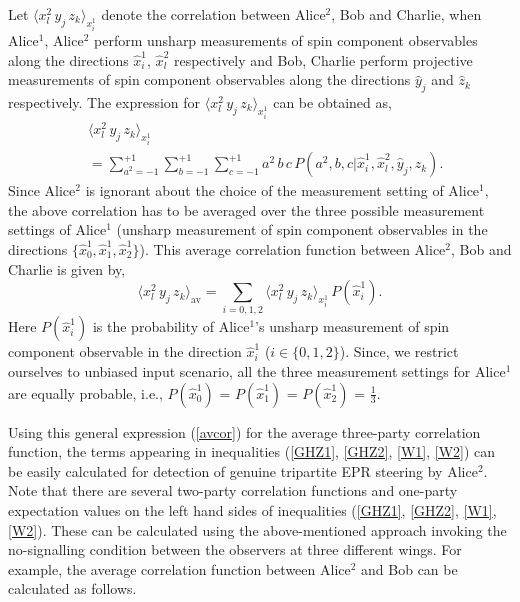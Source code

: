 \documentclass[pra,a4paper,aps,twocolumn,showpacs,superscriptaddress,groupedaddress]{revtex4}
\begin{document}

Let $\langle x^2_l \, y_j \, z_k \rangle_{x^1_i}$ denote the correlation between Alice$^2$, Bob and Charlie, when Alice$^1$, Alice$^2$ perform unsharp measurements of spin component observables along the directions $\hat{x}^1_i$, $\hat{x}^2_l$ respectively and Bob, Charlie perform projective measurements of spin component observables along the directions $\hat{y}_j$ and $\hat{z}_k$ respectively. The expression for $\langle x^2_l \, y_j \, z_k \rangle_{x^1_i} $ can be obtained as,
\begin{align}
& \langle x^2_l \, y_j \, z_k \rangle_{x^1_i} \nonumber \\
&= \sum_{a^2 = -1}^{ +1} \sum_{b =  -1}^{ +1} \sum_{c = -1}^{ +1} a^2 \, b \, c \, P(a^2, b, c|\hat{x}^1_i, \hat{x}^2_l, \hat{y}_j, \hat{z}_k).
\end{align}
Since Alice$^2$ is ignorant about the choice of the measurement setting of Alice$^1$, the above correlation has to be averaged over the three possible measurement settings of Alice$^1$ (unsharp measurement of spin component observables in the directions $\{ \hat{x}^1_0, \hat{x}^1_1, \hat{x}^1_2 \}$). This average correlation function between Alice$^2$, Bob and Charlie is given by,
\begin{equation}
\langle x^2_l \, y_j \, z_k \rangle_{\text{av}} = \sum_{i = 0,1,2} \langle x^2_l \, y_j \, z_k \rangle_{x^1_i} \, P(\hat{x}^1_i).
\label{avcor}
\end{equation}
Here $P(\hat{x}^1_i)$ is the probability of Alice$^1$'s unsharp measurement of spin component observable in the direction $\hat{x}^1_i$ ($i \in \{ 0, 1, 2 \}$). Since, we restrict ourselves to unbiased input scenario, all the three measurement settings for Alice$^1$ are equally probable, i.e.,  $P(\hat{x}^1_0)$ = $P(\hat{x}^1_1)$ = $P(\hat{x}^1_2)$ = $\frac{1}{3}$. 

Using this general expression (\ref{avcor}) for the average three-party correlation function, the terms appearing in inequalities (\ref{GHZ1}, \ref{GHZ2}, \ref{W1}, \ref{W2}) can be easily calculated for detection of genuine tripartite EPR steering by Alice$^2$. %
Note that there are several two-party correlation functions and one-party expectation values on the left hand sides of inequalities (\ref{GHZ1}, \ref{GHZ2}, \ref{W1}, \ref{W2}). These can be calculated using the above-mentioned approach invoking the no-signalling condition between the observers at three different wings. For example, the average correlation function between Alice$^2$ and Bob can be calculated as follows. 
\end{document}
